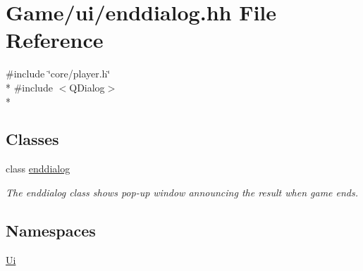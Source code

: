 \hypertarget{enddialog_8hh}{\section{Game/ui/enddialog.hh File Reference}
\label{enddialog_8hh}
}
{\ttfamily \#include \char`\"{}core/player.\-h\char`\"{}}\\*
{\ttfamily \#include $<$Q\-Dialog$>$}\\*
\subsection*{Classes}
\begin{DoxyCompactItemize}
\item 
class \hyperlink{classenddialog}{enddialog}
\begin{DoxyCompactList}\small\item\em The enddialog class shows pop-\/up window announcing the result when game ends. \end{DoxyCompactList}\end{DoxyCompactItemize}
\subsection*{Namespaces}
\begin{DoxyCompactItemize}
\item 
\hyperlink{namespaceUi}{Ui}
\end{DoxyCompactItemize}
